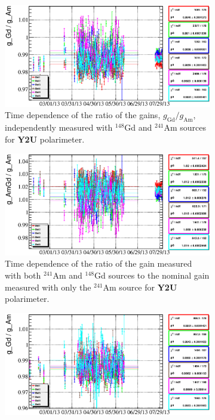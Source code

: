 \documentclass[a4paper,12pt]{article}
\newcommand\americium{${}^{241}$Am}
\newcommand\gadolinium{${}^{148}$Gd}
\begin{document}
\newcommand\gainrealationslabel{Comparison of the effective detector gains
calculated with either one or both $\alpha$-sources for the polarimeters
equipped with two alpha sources. Outliers are not shown on the plots.
Colors represent individual detectors.}
\begin{figure}
%
\begin{subfigure}[t]{0.49\textwidth}
\includegraphics[width=\textwidth]{gfx/run13_alpha_study/Y2U/c_chGdGain_over_AmGain_by_day_Y2U.eps}
\caption{Time dependence of the ratio of the gains, $g_\text{Gd}/g_\text{Am}$,
independently measured with \gadolinium{} and \americium{} sources for
\textbf{Y2U} polarimeter.}
\end{subfigure}
%
\hfill
%
\begin{subfigure}[t]{0.49\textwidth}
\includegraphics[width=\textwidth]{gfx/run13_alpha_study/Y2U/c_chAmGdGain_over_AmGain_by_day_Y2U.eps}
\caption{Time dependence of the ratio of the gain measured with both \americium{} and
\gadolinium{} sources to the nominal gain measured with only the \americium{}
source for \textbf{Y2U} polarimeter.}
\end{subfigure}
%
\begin{subfigure}[t]{0.49\textwidth}
\includegraphics[width=\textwidth]{gfx/run13_alpha_study/B2D/c_chGdGain_over_AmGain_by_day_B2D.eps}

\end{subfigure}
\end{figure}
\end{document}
